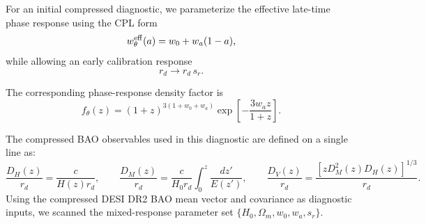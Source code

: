 \documentclass[11pt]{article}
\begin{document}
For an initial compressed diagnostic, we parameterize the effective late-time phase response using the CPL form
\begin{equation}
w_\theta^{\rm eff}(a)
=
w_0+w_a(1-a),
\end{equation}
while allowing an early calibration response
\begin{equation}
r_d
\rightarrow
r_d\,s_r.
\end{equation}

The corresponding phase-response density factor is
\begin{equation}
\boxed{
f_\theta(z)
=
(1+z)^{3(1+w_0+w_a)}
\exp
\left[
-\frac{3w_a z}{1+z}
\right].
}
\end{equation}

The compressed BAO observables used in this diagnostic are defined on a single line as:
\begin{equation}
\frac{D_H(z)}{r_d} = \frac{c}{H(z)r_d}, \qquad \frac{D_M(z)}{r_d} = \frac{c}{H_0r_d}\int_0^z\frac{dz'}{E(z')}, \qquad \frac{D_V(z)}{r_d} = \frac{\left[zD_M^2(z)D_H(z)\right]^{1/3}}{r_d}.
\end{equation}
Using the compressed DESI DR2 BAO mean vector and covariance as diagnostic inputs, we scanned the mixed-response parameter set $\{H_0, \Omega_m, w_0, w_a, s_r\}$.
\end{document}
